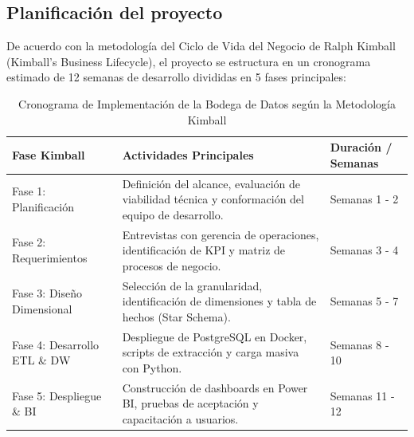 \subsection{Planificación del proyecto}
De acuerdo con la metodología del Ciclo de Vida del Negocio de Ralph Kimball (Kimball's Business Lifecycle), el proyecto se estructura en un cronograma estimado de 12 semanas de desarrollo divididas en 5 fases principales:
\begin{table}[H]
	\caption{Cronograma de Implementación de la Bodega de Datos según la Metodología Kimball}
	\label{tab:cronograma_kimball}
	\addtocounter{table}{-1}
	\begin{tabularx}{\linewidth}{>{\raggedright\arraybackslash}p{3.5cm} >{\raggedright\arraybackslash}X >{\centering\arraybackslash}p{3.5cm}}
		\toprule
		\textbf{Fase Kimball} & \textbf{Actividades Principales} & \textbf{Duración / Semanas} \\
		\midrule
		Fase 1: Planificación & Definición del alcance, evaluación de viabilidad técnica y conformación del equipo de desarrollo. & Semanas 1 - 2 \\
		\addlinespace
		Fase 2: Requerimientos & Entrevistas con gerencia de operaciones, identificación de KPI y matriz de procesos de negocio. & Semanas 3 - 4 \\
		\addlinespace
		Fase 3: Diseño Dimensional & Selección de la granularidad, identificación de dimensiones y tabla de hechos (Star Schema). & Semanas 5 - 7 \\
		\addlinespace
		Fase 4: Desarrollo ETL \& DW & Despliegue de PostgreSQL en Docker, scripts de extracción y carga masiva con Python. & Semanas 8 - 10 \\
		\addlinespace
		Fase 5: Despliegue \& BI & Construcción de dashboards en Power BI, pruebas de aceptación y capacitación a usuarios. & Semanas 11 - 12 \\
		\bottomrule
	\end{tabularx}
\end{table}